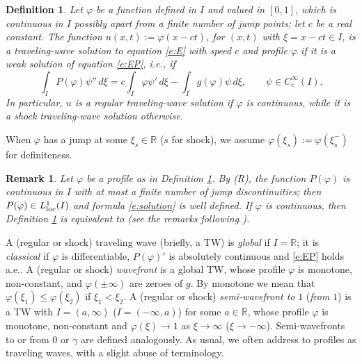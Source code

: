 \documentclass[11pt,a4paper]{article}
\newcommand{\R}{\mathbb R}
\newtheorem{definition}{Definition}[section]
\newtheorem{remark}{Remark}[section]
\renewcommand{\phi}{\varphi}
\begin{document}
\begin{definition}\label{d:regular-shock} 
Let $\varphi$ be a function defined in $I$ and valued in $[0,1]$, which is continuous in $I$ possibly apart from a finite number of jump points; let $c$ be a real constant. The function $u(x,t):=\varphi(x-ct)$, for $(x,t)$ with $\xi=x-ct \in I$, is a {\em traveling-wave} solution to equation \eqref{e:E} with speed $c$ and profile $\phi$ if it is a weak solution of equation \eqref{e:EP}, i.e., if
\begin{equation}\label{e:solution}
\int_I P(\phi)\psi''\, d\xi = c\int_I \phi\psi'\, d\xi -\int_I g(\phi)\psi\, d\xi, \qquad \psi\in C_c^\infty(I).
\end{equation}
In particular,  $u$ is a {\em regular traveling-wave} solution if $\phi$ is continuous, while it is a {\em shock traveling-wave}  solution  otherwise.
\end{definition}

When $\phi$ has a jump at some $\xi_s\in\R$ ($s$ for shock), we assume $\phi(\xi_s):=\phi(\xi_s^-)$ for definiteness.

\begin{remark}\label{r:aboutDef}
{\rm 
Let $\phi$ be a profile as in Definition \ref{d:regular-shock}.
By (R), the function   $P(\phi)$ is continuous in $I$ with at most a finite number of jump discontinuities; then $P(\phi) \in  L_{\rm loc}^1(I)$ and formula \eqref{e:solution} is well defined.
If $\phi$ is continuous, then Definition \ref{d:regular-shock}  is equivalent to \cite[Def. 2.2]{GK} (see the remarks following \cite[Def. 2.2]{GK}). %
}
\end{remark}

A (regular or shock) traveling wave (briefly, a TW) is {\em global} if $I=\R$; it is {\em classical} if $\varphi$ is differentiable, $P(\varphi)'$ is absolutely continuous and \eqref{e:EP} holds a.e.. A (regular or shock) {\em wavefront} is a global TW, whose profile $\phi$ is monotone, non-constant, and $\phi(\pm\infty)$ are zeroes of $g$. By monotone we mean that $\phi(\xi_1)\le\phi(\xi_2)$  if $\xi_1<\xi_2$. A (regular or shock) {\em semi-wavefront to} $1$ ({\em from} $1$) is a TW with $I=(a,\infty)$ ($I=(-\infty,a)$) for some $a\in\R$, whose profile $\phi$ is monotone, non-constant and $\phi(\xi)\to1$ as $\xi\to\infty$ ($\xi\to-\infty$). Semi-wavefronts to or from $0$ or $\gamma$ are defined analogously. As usual, we often address to profiles as traveling waves, with a slight abuse of terminology. 
\end{document}
